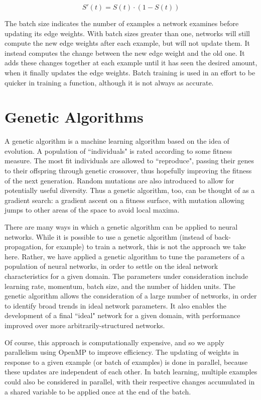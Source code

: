 \documentclass[10pt, conference, compsocconf]{IEEEtran}
\begin{document}
$$S'(t) = S(t) \cdot (1-S(t))$$

The batch size indicates the number of examples a network examines before updating its edge weights.  With batch sizes greater than one, networks will still compute the new edge weights after each example, but will not update them. It instead computes the change between the new edge weight and the old one. It adds these changes together at each example until it has seen the desired amount, when it finally updates the edge weights. Batch training is used in an effort to be quicker in training a function, although it is not always as accurate.

\section{Genetic Algorithms}

A genetic algorithm \cite{AImodern} is a machine learning algorithm based on the idea of evolution. A population of ``individuals" is rated according to some fitness measure. The most fit individuals are allowed to ``reproduce", passing their genes to their offspring through genetic crossover, thus hopefully improving the fitness of the next generation. Random mutations are also introduced to allow for potentially useful diversity. Thus a genetic algorithm, too, can be thought of as a gradient search: a gradient ascent on a fitness surface, with mutation allowing jumps to other areas of the space to avoid local maxima.

There are many ways in which a genetic algorithm can be applied to neural networks. While it is possible to use a genetic algorithm (instead of back-propagation, for example) to train a network, this is not the approach we take here. Rather, we have applied a genetic algorithm to tune the parameters of a population of neural networks, in order to settle on the ideal network characteristics for a given domain. The parameters under consideration include learning rate, momentum, batch size, and the number of hidden units. The genetic algorithm allows the consideration of a large number of networks, in order to identify broad trends in ideal network parameters. It also enables the development of a final ``ideal" network for a given domain, with performance improved over more arbitrarily-structured networks.

Of course, this approach is computationally expensive, and so we apply parallelism using OpenMP \cite{OpenMP} to improve efficiency. The updating of weights in response to a given example (or batch of examples) is done in parallel, because these updates are independent of each other. In batch learning, multiple examples could also be considered in parallel, with their respective changes accumulated in a shared variable to be applied once at the end of the batch.
\end{document}
